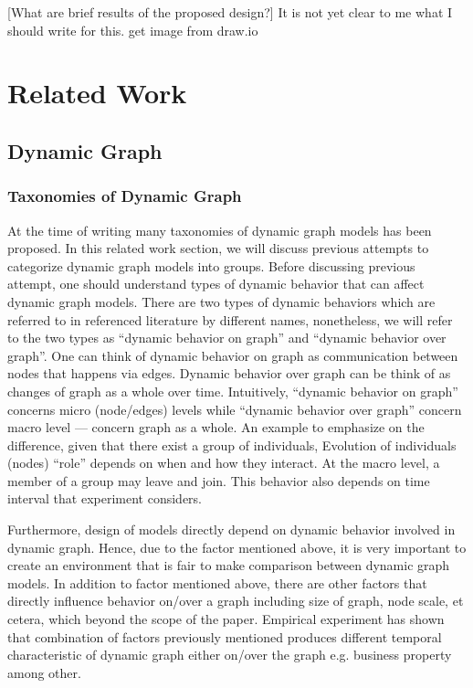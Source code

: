 \documentclass{IEEEtran}
\begin{document}
[What are brief results of the proposed design?] It is not yet clear to me what I should write for this.
get image from draw.io


\section{Related Work}
\label{sec:orga6c8f1d}
\subsection{Dynamic Graph}
\label{sec:orgeb9d326}
\subsubsection{Taxonomies of Dynamic Graph}
\label{taxonomies of dynamic graph}
At the time of writing many taxonomies of dynamic graph models has been proposed.
In this related work section, we will discuss previous attempts to categorize dynamic graph models into groups. Before discussing previous attempt, one should understand types of dynamic behavior that can affect dynamic graph models. There are two types of dynamic behaviors which are referred to in referenced literature by different names, nonetheless, we will refer to the two types as ``dynamic behavior on graph'' and ``dynamic behavior over graph''. One can think of dynamic behavior on graph as communication between nodes that happens via edges. Dynamic  behavior over graph can be think of as changes of graph as a whole over time. Intuitively, ``dynamic behavior on graph'' concerns micro (node/edges) levels while ``dynamic behavior over graph'' concern macro level --- concern graph as a whole. An example to emphasize on the difference, given that there exist a group of individuals, Evolution of individuals (nodes) ``role'' depends on when and how they interact. At the macro level, a member of a group may leave and join. This behavior also depends on time interval that experiment considers.

Furthermore, design of models directly depend on dynamic behavior involved in dynamic graph. Hence, due to the factor mentioned above, it is very important to create an environment that is fair to make comparison between dynamic graph models. In addition to factor mentioned above, there are other factors that directly influence behavior on/over a graph including size of graph, node scale, et cetera, which beyond the scope of the paper. Empirical experiment has shown that combination of factors previously mentioned produces different temporal characteristic of dynamic graph either on/over the graph e.g. business property \cite{holme2012temporal} among other.
\end{document}
